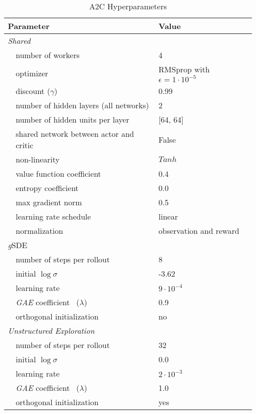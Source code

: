 \documentclass{article}
\newcommand{\ourSDE}{\textit{g}\textsc{SDE}\xspace}
\newcommand{\aac}{\textsc{A2C}\xspace}
\begin{document}
\begin{table}[h]
\renewcommand{\arraystretch}{1.1}
\centering
\caption{\aac Hyperparameters}
\label{tab:a2c_shared_params}
\vspace{1mm}
  \begin{tabular}{@{}l l| l@{}}
    \toprule
    \multicolumn{2}{l|}{Parameter} &  Value\\
    \midrule
    \multicolumn{2}{l|}{\textit{Shared}}& \\
    & number of workers &  4\\
    & optimizer & RMSprop with $\epsilon = 1 \cdot 10^{-5}$\\
    & discount ($\gamma$) &  0.99\\
    & number of hidden layers (all networks) & 2\\
    & number of hidden units per layer & [64, 64]\\
    & shared network between actor and critic & False\\
    & non-linearity & $Tanh$\\
    & value function coefficient & 0.4\\
    & entropy coefficient & 0.0\\
    & max gradient norm & 0.5\\
    & learning rate schedule & linear \\
    & normalization & observation and reward~\citep{hill2018stable}\\
    \midrule
    \multicolumn{2}{l|}{\ourSDE}& \\
    & number of steps per rollout &  8\\
    & initial $\log \sigma$ & -3.62\\
    & learning rate & $9 \cdot 10^{-4}$\\
    & \textit{GAE} coefficient~\citep{schulman2015high} ($\lambda$) &  0.9\\
    & orthogonal initialization~\citep{engstrom2020implementation} & no \\
    \midrule
    \multicolumn{2}{l|}{\textit{Unstructured Exploration}}& \\
    & number of steps per rollout & 32\\
    & initial $\log \sigma$ & 0.0\\
    & learning rate & $2 \cdot 10^{-3}$\\
    & \textit{GAE} coefficient~\citep{schulman2015high} ($\lambda$) &  1.0\\
    & orthogonal initialization~\citep{engstrom2020implementation} & yes \\

    \bottomrule
  \end{tabular}
\end{table}
\end{document}
